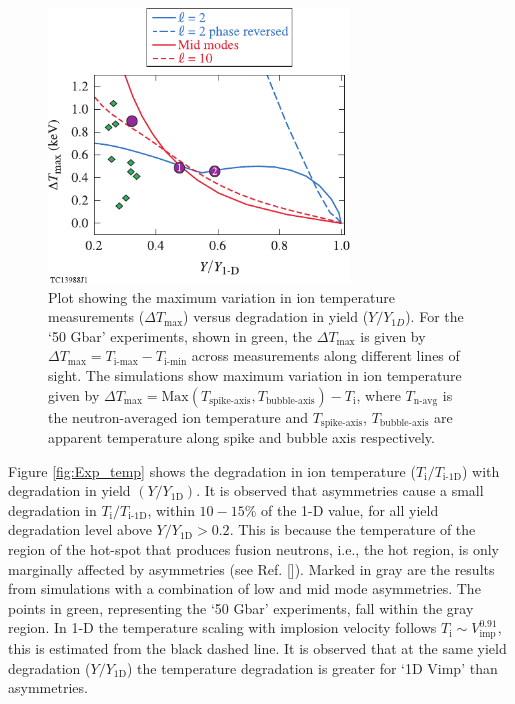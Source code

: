 \documentclass[aip,reprint]{revtex4-1}
\begin{document}
\begin{figure}
\includegraphics[width=80mm]{Fig13_Bose}
\caption{\label{fig:Exp_tempVar} 
Plot showing the maximum variation in ion temperature measurements ($\Delta T_\text{max}$) versus degradation in yield ($Y/Y_{1D}$). For the `50 Gbar' experiments, shown in green, the $\Delta T_\text{max}$ is given by $\Delta T_\text{max} = T_\text{i-max}- T_\text{i-min}$ across measurements along different lines of sight. The simulations show maximum variation in ion temperature given by $\Delta T_\text{max} = \text{Max}(T_\text{spike-axis},T_\text{bubble-axis})- T_\text{i}$, where $T_\text{n-avg}$ is the neutron-averaged ion temperature and $T_\text{spike-axis}$, $T_\text{bubble-axis}$ are apparent temperature along spike and bubble axis respectively.
}
\end{figure}
%
%


Figure \ref{fig:Exp_temp} shows the degradation in ion temperature ($T_\text{i}/T_\text{i-1D}$) with degradation in yield $(Y/Y_\text{1D})$. It is observed that asymmetries cause a small degradation in $T_\text{i}/T_\text{i-1D}$, within $10-15 \%$ of the 1-D value, for all yield degradation level above $Y/Y_\text{1D}>0.2$. This is because the temperature of the region of the hot-spot that produces fusion neutrons, i.e., the hot region, is only marginally affected by asymmetries (see Ref. []). Marked in gray are the results from simulations with a combination of low and mid mode asymmetries. The points in green, representing the `50 Gbar' experiments, fall within the gray region. In 1-D the temperature scaling with implosion velocity follows $T_\text{i} \sim V_\text{imp}^{0.91}$, this is estimated from the black dashed line. It is observed that at the same yield degradation ($Y/Y_\text{1D}$) the temperature degradation is greater for `1D Vimp' than asymmetries.
\end{document}
